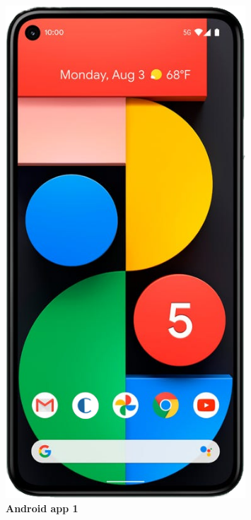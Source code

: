 \begin{figure}[!htb]
\centering
\begin{minipage}{0.4\textwidth}
\centering
\includegraphics[width=0.8\textwidth]{Images/App/Android_AppIcon}
\caption{\label{fig:android1}\textbf{Android app 1}}
\end{minipage}
\begin{minipage}{0.4\textwidth}
\centering

\end{minipage}
\end{figure}
